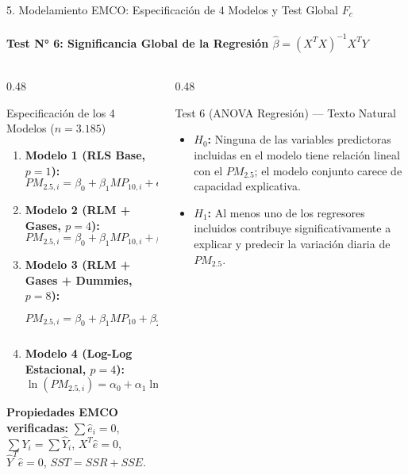\documentclass[aspectratio=169, 9pt]{beamer}
\begin{document}
\begin{frame}{5. Modelamiento EMCO: Especificación de 4 Modelos y Test Global $F_c$}
\framesubtitle{Test N° 6: Significancia Global de la Regresión $\hat{\beta} = (X^T X)^{-1} X^T Y$}

\begin{columns}[T]
  \begin{column}{0.48\textwidth}
    \begin{block}{\footnotesize Especificación de los 4 Modelos ($n = 3.185$)}
      \scriptsize
      \begin{enumerate}\scriptsize\setlength{\itemsep}{2pt}
        \item \textbf{Modelo 1 (RLS Base, $p=1$):}
        $$PM_{2.5, i} = \beta_0 + \beta_1 MP_{10, i} + \epsilon_i$$
        \item \textbf{Modelo 2 (RLM + Gases, $p=4$):}
        $$PM_{2.5, i} = \beta_0 + \beta_1 MP_{10, i} + \beta_2 CO_i + \beta_3 NO_{2, i} + \beta_4 O_{3, i} + \epsilon_i$$
        \item \textbf{Modelo 3 (RLM + Gases + Dummies, $p=8$):}
        $$PM_{2.5, i} = \beta_0 + \beta_1 MP_{10} + \beta_2 CO + \beta_3 NO_2 + \beta_4 O_3 + \sum_{m=1}^3 \gamma_m D_m + \delta\text{FDS} + \epsilon_i$$
        \item \textbf{Modelo 4 (Log-Log Estacional, $p=4$):}
        $$\ln(PM_{2.5, i}) = \alpha_0 + \alpha_1 \ln(MP_{10, i}) + \alpha_2 \ln(CO_i) + \gamma_1 D_{\text{Oto}} + \gamma_2 D_{\text{Inv}} + u_i$$
      \end{enumerate}
    \end{block}
    {\tiny \textbf{Propiedades EMCO verificadas:} $\sum \hat{e}_i = 0$, $\sum Y_i = \sum \hat{Y}_i$, $X^T\hat{e} = 0$, $\hat{Y}^T\hat{e} = 0$, $SST = SSR + SSE$.}
  \end{column}

  \begin{column}{0.48\textwidth}
    \begin{alertblock}{\footnotesize Test 6 (ANOVA Regresión) — Texto Natural}
      \scriptsize
      \begin{itemize}\setlength{\itemsep}{1pt}
        \item \textbf{$H_0$:} Ninguna de las variables predictoras incluidas en el modelo tiene relación lineal con el $PM_{2.5}$; el modelo conjunto carece de capacidad explicativa.
        \item \textbf{$H_1$:} Al menos uno de los regresores incluidos contribuye significativamente a explicar y predecir la variación diaria de $PM_{2.5}$.
      \end{itemize}
    \end{alertblock}


\end{column}
\end{columns}
\end{frame}
\end{document}
